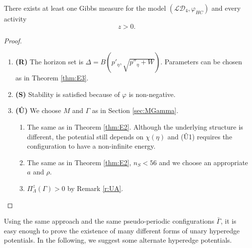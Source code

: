 \begin{theorem}\label{thm:E4}
	There exists at least one Gibbs measure for the model $(\mathcal {LD}_4,\varphi_{HC})$ and every activity $$z>0.$$
\end{theorem}
\begin{proof}
\begin{enumerate}[]
	\item \textbf{(R)} The horizon set is $\Delta = B(p'_\eta,\sqrt{p''_\eta +W})$. Parameters can be chosen as in Theorem \ref{thm:E3}. 
	\item \textbf{(S)} Stability is satisfied because of $\varphi$ is non-negative.
	\item \textbf{(\^U)} We choose $M$ and $\Gamma$ as in Section \ref{sec:MGamma}.
		\begin{enumerate}[(U1)]
			\item The same as in Theorem \ref{thm:E2}. Although the underlying structure is different, the potential still depends on $\chi(\eta)$ and (\^U1) requires the configuration to have a non-infinite energy.
			\item The same as in Theorem \ref{thm:E2}, $n_S<56$ and we choose an appropriate $a$ and $\rho$.
			\item $\Pi^z_\Lambda(\Gamma)>0$ by Remark \ref{r:UA}.
		\end{enumerate}
\end{enumerate}
\end{proof}




Using the same approach and the same pseudo-periodic configurations $\bar\Gamma$, it is easy enough to prove the existence of many different forms of unary hyperedge potentials. In the following, we suggest some alternate hyperedge potentials. 


